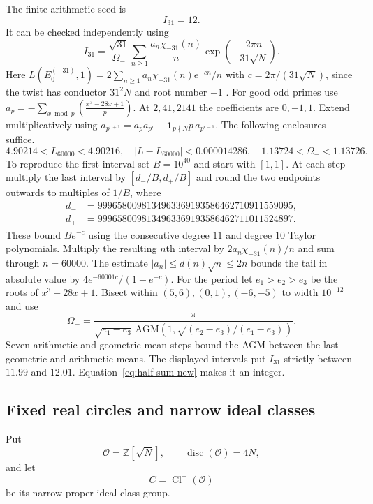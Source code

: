 \documentclass[11pt]{article}
\begin{document}
The finite arithmetic seed is
\begin{equation}\label{eq:seed31-new}
\boxed{I_{31}=12.}
\end{equation}
It can be checked independently using
\begin{equation}\label{eq:seed-afe-new}
I_{31}=
\frac{\sqrt{31}}{\Omega_-}
\sum_{n\ge1}\frac{a_n\chi_{-31}(n)}n
\exp\left(-\frac{2\pi n}{31\sqrt N}\right).
\end{equation}
Here $L(E_0^{(-31)},1)=2\sum_{n\ge1}a_n\chi_{-31}(n)e^{-cn}/n$
with $c=2\pi/(31\sqrt N)$, since the twist has conductor $31^2N$
and root number $+1$ \cite[Prop.~2.11.2]{CremonaBook}.
For good odd primes use
$a_p=-\sum_{x\bmod p}(\frac{x^3-28x+1}{p})$.
At $2,41,2141$ the coefficients are $0,-1,1$. Extend multiplicatively
using $a_{p^{r+1}}=a_pa_{p^r}-\mathbf1_{p\nmid N}p\,a_{p^{r-1}}$.
The following enclosures suffice.
\[
4.90214<L_{60000}<4.90216,\quad
|L-L_{60000}|<0.000014286,\quad
1.13724<\Omega_-<1.13726.
\]
To reproduce the first interval set $B=10^{40}$ and start with $[1,1]$.
At each step multiply the last interval by $[d_-/B,d_+/B]$ and
round the two endpoints outwards to multiples of $1/B$, where
\begin{align*}
d_- &= 9996580098134963369193586462710911559095,\\
d_+ &= 9996580098134963369193586462711011524897.
\end{align*}
These bound $Be^{-c}$ using the consecutive degree $11$ and degree
$10$ Taylor polynomials. Multiply the resulting $n$th interval by
$2a_n\chi_{-31}(n)/n$ and sum through $n=60000$. The estimate
$|a_n|\le d(n)\sqrt n\le2n$ bounds the tail in absolute value by
$4 e^{-60001c}/(1-e^{-c})$.
For the period let $e_1>e_2>e_3$ be the roots of $x^3-28x+1$.
Bisect within $(5,6),(0,1),(-6,-5)$ to width $10^{-12}$ and use
\[
\Omega_-=\frac{\pi}{\sqrt{e_1-e_3}\,
\mathrm{AGM}(1,\sqrt{(e_2-e_3)/(e_1-e_3)})}.
\]
Seven arithmetic and geometric mean steps bound the AGM between the
last geometric and arithmetic means. The displayed intervals put $I_{31}$
strictly between $11.99$ and $12.01$. Equation~\eqref{eq:half-sum-new}
makes it an integer.

\subsection{Fixed real circles and narrow ideal classes}

Put
\[
\mathcal O=\mathbb Z[\sqrt N],
\qquad \operatorname{disc}(\mathcal O)=4N,
\]
and let
\[
C=\operatorname{Cl}^{+}(\mathcal O)
\]
be its narrow proper ideal-class group.
\end{document}

